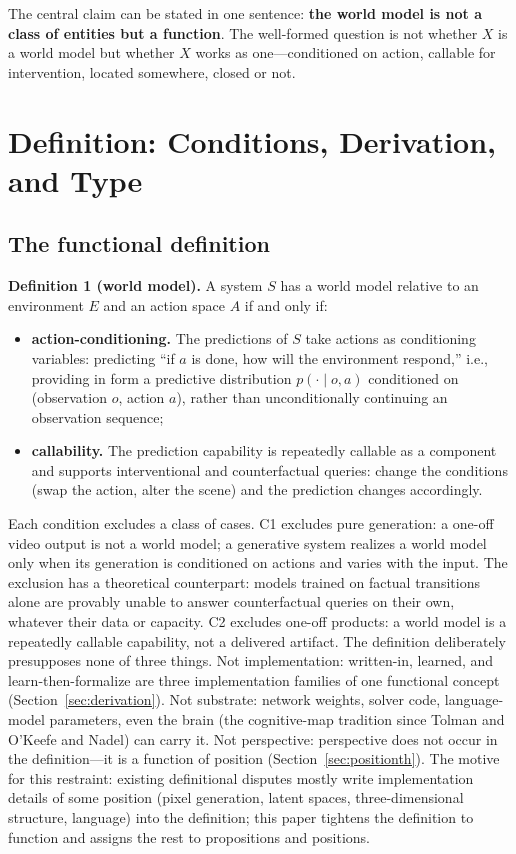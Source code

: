 \documentclass[10pt]{article}
\begin{document}
The central claim can be stated in one sentence: \textbf{the world model is not a class of entities but a function}. The well-formed question is not whether $X$ is a world model but whether $X$ works as one---conditioned on action, callable for intervention, located somewhere, closed or not.

\section{Definition: Conditions, Derivation, and Type}\label{sec:definition}

\subsection{The functional definition}\label{sec:functional}

\textbf{Definition 1 (world model).} A system $S$ has a world model relative to an environment $E$ and an action space $A$ if and only if:

\begin{itemize}
\item[(C1)] \textbf{action-conditioning.} The predictions of $S$ take actions as conditioning variables: predicting ``if $a$ is done, how will the environment respond,'' i.e., providing in form a predictive distribution $p(\cdot\mid o,a)$ conditioned on (observation $o$, action $a$), rather than unconditionally continuing an observation sequence;
\item[(C2)] \textbf{callability.} The prediction capability is repeatedly callable as a component and supports interventional and counterfactual queries: change the conditions (swap the action, alter the scene) and the prediction changes accordingly.
\end{itemize}

Each condition excludes a class of cases. C1 excludes pure generation: a one-off video output is not a world model; a generative system realizes a world model only when its generation is conditioned on actions and varies with the input. The exclusion has a theoretical counterpart: models trained on factual transitions alone are provably unable to answer counterfactual queries on their own, whatever their data or capacity\cite{balestriero2026counterfactual}. C2 excludes one-off products: a world model is a repeatedly callable capability, not a delivered artifact. 
The definition deliberately presupposes none of three things. Not implementation: written-in, learned, and learn-then-formalize are three implementation families of one functional concept (Section~\ref{sec:derivation}). Not substrate: network weights, solver code, language-model parameters, even the brain (the cognitive-map tradition since Tolman\cite{tolman1948} and O'Keefe and Nadel\cite{okeefe1978}) can carry it. Not perspective: perspective does not occur in the definition---it is a function of position (Section~\ref{sec:positionth}). The motive for this restraint: existing definitional disputes mostly write implementation details of some position (pixel generation, latent spaces, three-dimensional structure, language) into the definition; this paper tightens the definition to function and assigns the rest to propositions and positions.
\end{document}
